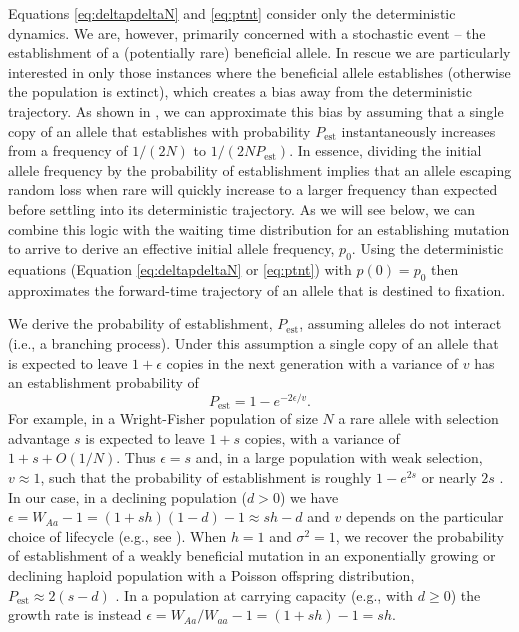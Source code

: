 \documentclass[]{article}
\begin{document}
Equations \ref{eq:deltapdeltaN} and \ref{eq:ptnt} consider only the deterministic dynamics. 
We are, however, primarily concerned with a stochastic event -- the establishment of a (potentially rare) beneficial allele.
In rescue we are particularly interested in only those instances where the beneficial allele establishes (otherwise the population is extinct), which creates a bias away from the deterministic trajectory.
As shown in \cite{smith1971use} \citep[see][for an application to evolutionary rescue]{orr2014population}, we can approximate this bias by assuming that a single copy of an allele that establishes with probability $P_\mathrm{est}$ instantaneously increases from a frequency of $1/(2N)$ to $1/(2NP_\mathrm{est})$.
In essence, dividing the initial allele frequency by the probability of establishment implies that an allele escaping random loss when rare will quickly increase to a larger frequency than expected before settling into its deterministic trajectory.
As we will see below, we can combine this logic with the waiting time distribution for an establishing mutation to arrive to derive an effective initial allele frequency, $p_0$.
Using the deterministic equations (Equation \ref{eq:deltapdeltaN} or \ref{eq:ptnt}) with $p(0) = p_0$ then approximates the forward-time trajectory of an allele that is destined to fixation.

We derive the probability of establishment, $P_\mathrm{est}$, assuming alleles do not interact (i.e., a branching process).
Under this assumption a single copy of an allele that is expected to leave $1+\epsilon$ copies in the next generation with a variance of $v$ has an establishment probability of \citep[][p.\ 172, see also \citealp{feller1951diffusion}, equation 5.7, for a derivation from a diffusion approximation]{allen2010introduction}
\begin{equation}\label{eq:pest}
P_\mathrm{est} = 1 - e^{-2 \epsilon/v}.
\end{equation}
For example, in a Wright-Fisher population of size $N$ a rare allele with selection advantage $s$ is expected to leave $1+s$ copies, with a variance of $1+s+O(1/N)$.
Thus $\epsilon=s$ and, in a large population with weak selection, $v \approx 1$, such that the probability of establishment is roughly $1-e^{2s}$ \citep[][p.\ 80]{fisher1999genetical} or nearly $2s$ \citep{haldane1927mathematical}. 
In our case, in a declining population ($d>0$) we have $\epsilon = W_{Aa} - 1 = (1 + s h)(1-d)-1 \approx s h - d$ and $v$ depends on the particular choice of lifecycle (e.g., see ).
When $h=1$ and $\sigma^2=1$, we recover the probability of establishment of a weakly beneficial mutation in an exponentially growing or declining haploid population with a Poisson offspring distribution, $P_\mathrm{est} \approx 2(s - d)$ \citep{otto1997probability}.
In a population at carrying capacity (e.g., with $d\geq0$) the growth rate is instead $\epsilon = W_{Aa}/W_{aa} - 1 = (1 + s h)-1 = s h$. 
\end{document}
